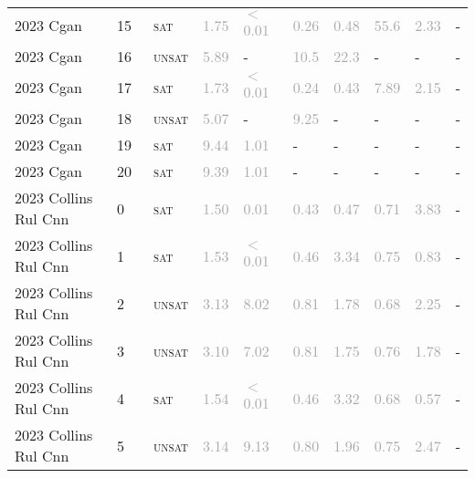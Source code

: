 \begin{center}
{\begin{longtable}{@{}llllllllll@{}}
2023 Cgan & 15 & ~\textsc{sat} & \textcolor{darkgray}{1.75} & \textcolor{darkgray}{$<$0.01} & \textcolor{darkgray}{0.26} & \textcolor{darkgray}{0.48} & \textcolor{darkgray}{55.6} & \textcolor{darkgray}{2.33} & - \\
2023 Cgan & 16 & ~\textsc{unsat} & \textcolor{darkgray}{5.89} & - & \textcolor{darkgray}{10.5} & \textcolor{darkgray}{22.3} & - & - & - \\
2023 Cgan & 17 & ~\textsc{sat} & \textcolor{darkgray}{1.73} & \textcolor{darkgray}{$<$0.01} & \textcolor{darkgray}{0.24} & \textcolor{darkgray}{0.43} & \textcolor{darkgray}{7.89} & \textcolor{darkgray}{2.15} & - \\
2023 Cgan & 18 & ~\textsc{unsat} & \textcolor{darkgray}{5.07} & - & \textcolor{darkgray}{9.25} & - & - & - & - \\
2023 Cgan & 19 & ~\textsc{sat} & \textcolor{darkgray}{9.44} & \textcolor{darkgray}{1.01} & - & - & - & - & - \\
2023 Cgan & 20 & ~\textsc{sat} & \textcolor{darkgray}{9.39} & \textcolor{darkgray}{1.01} & - & - & - & - & - \\
\midrule
2023 Collins Rul Cnn & 0 & ~\textsc{sat} & \textcolor{darkgray}{1.50} & \textcolor{darkgray}{0.01} & \textcolor{darkgray}{0.43} & \textcolor{darkgray}{0.47} & \textcolor{darkgray}{0.71} & \textcolor{darkgray}{3.83} & - \\
2023 Collins Rul Cnn & 1 & ~\textsc{sat} & \textcolor{darkgray}{1.53} & \textcolor{darkgray}{$<$0.01} & \textcolor{darkgray}{0.46} & \textcolor{darkgray}{3.34} & \textcolor{darkgray}{0.75} & \textcolor{darkgray}{0.83} & - \\
2023 Collins Rul Cnn & 2 & ~\textsc{unsat} & \textcolor{darkgray}{3.13} & \textcolor{darkgray}{8.02} & \textcolor{darkgray}{0.81} & \textcolor{darkgray}{1.78} & \textcolor{darkgray}{0.68} & \textcolor{darkgray}{2.25} & - \\
2023 Collins Rul Cnn & 3 & ~\textsc{unsat} & \textcolor{darkgray}{3.10} & \textcolor{darkgray}{7.02} & \textcolor{darkgray}{0.81} & \textcolor{darkgray}{1.75} & \textcolor{darkgray}{0.76} & \textcolor{darkgray}{1.78} & - \\
2023 Collins Rul Cnn & 4 & ~\textsc{sat} & \textcolor{darkgray}{1.54} & \textcolor{darkgray}{$<$0.01} & \textcolor{darkgray}{0.46} & \textcolor{darkgray}{3.32} & \textcolor{darkgray}{0.68} & \textcolor{darkgray}{0.57} & - \\
2023 Collins Rul Cnn & 5 & ~\textsc{unsat} & \textcolor{darkgray}{3.14} & \textcolor{darkgray}{9.13} & \textcolor{darkgray}{0.80} & \textcolor{darkgray}{1.96} & \textcolor{darkgray}{0.75} & \textcolor{darkgray}{2.47} & - \\

\end{longtable}}
\end{center}
